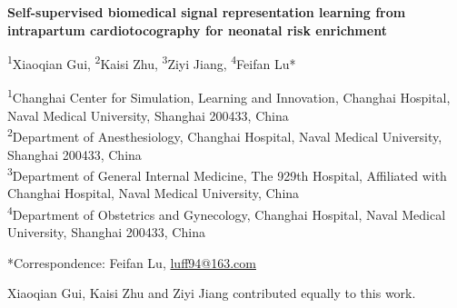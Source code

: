 \documentclass[11pt]{article}
\begin{document}
        \linenumbers

        \begin{center}
{\Large \textbf{Self-supervised biomedical signal representation learning from intrapartum cardiotocography for neonatal risk enrichment}}

\textsuperscript{1}Xiaoqian Gui, \textsuperscript{2}Kaisi Zhu, \textsuperscript{3}Ziyi Jiang, \textsuperscript{4}Feifan Lu*

\textsuperscript{1}Changhai Center for Simulation, Learning and Innovation, Changhai Hospital, Naval Medical University, Shanghai 200433, China\\\textsuperscript{2}Department of Anesthesiology, Changhai Hospital, Naval Medical University, Shanghai 200433, China\\\textsuperscript{3}Department of General Internal Medicine, The 929th Hospital, Affiliated with Changhai Hospital, Naval Medical University, China\\\textsuperscript{4}Department of Obstetrics and Gynecology, Changhai Hospital, Naval Medical University, Shanghai 200433, China

*Correspondence: Feifan Lu, \url{luff94@163.com}

Xiaoqian Gui, Kaisi Zhu and Ziyi Jiang contributed equally to this work.
\end{center}
\end{document}
